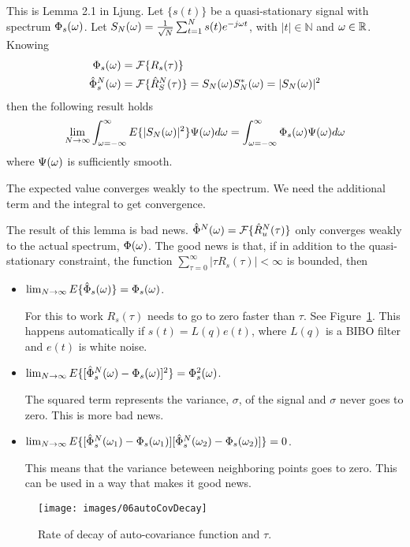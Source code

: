 \begin{lemma}
This is Lemma 2.1 in Ljung.
Let $\{s(t)\}$ be a quasi-stationary signal with spectrum $\Phi_s(\omega)$.
Let $S_N(\omega) = \frac{1}{\sqrt{N}} \sum_{t=1}^N s(t)e^{-j\omega t}$, with $|t|\in\mathbb{N}$ and $\omega\in\mathbb{R}$.
Knowing
\begin{align*}
\Phi_s(\omega) &= \mathcal{F}\{R_s(\tau)\} \\
\hat{\Phi}_s^N(\omega) &= \mathcal{F}\{\hat{R}_S^N(\tau)\} = S_N(\omega)S_N^*(\omega) = |S_N(\omega)|^2
\end{align*}
then the following result holds
$$\lim_{N\to\infty} \int_{\omega=-\infty}^\infty E\{|S_N(\omega)|^2\}\Psi(\omega)d\omega = \int_{\omega=-\infty}^\infty \Phi_s(\omega)\Psi(\omega)d\omega$$
where $\Psi(\omega)$ is sufficiently smooth.
\end{lemma}
The expected value converges weakly to the spectrum.
We need the additional term and the integral to get convergence.

The result of this lemma is bad news.
$\hat{\Phi}^N(\omega) = \mathcal{F}\{\hat{R}_u^N(\tau)\}$ only converges weakly to the actual spectrum, $\Phi(\omega)$.
The good news is that, if in addition to the quasi-stationary constraint, the function $\sum_{\tau=0}^\infty|\tau R_s(\tau)|<\infty$ is bounded, then
\begin{itemize}
\item $\lim_{N\to\infty}E\{\hat{\Phi}_s(\omega)\} = \Phi_s(\omega)$.

      For this to work $R_s(\tau)$ needs to go to zero faster than $\tau$.
      See Figure~\ref{fig:06autoCovDecay}.
      This happens automatically if $s(t)=L(q)e(t)$, where $L(q)$ is a BIBO filter and $e(t)$ is white noise.
\item $\lim_{N\to\infty}E\{[\hat{\Phi}_s^N(\omega)-\Phi_s(\omega)]^2\} = \Phi_s^2(\omega)$.%

      The squared term represents the variance, $\sigma$, of the signal and $\sigma$ never goes to zero.
      This is more bad news.
\item $\lim_{N\to\infty}E\{[\hat{\Phi}_s^N(\omega_1)-\Phi_s(\omega_1)][\hat{\Phi}_s^N(\omega_2)-\Phi_s(\omega_2)]\} = 0$.

      This means that the variance beteween neighboring points goes to zero.
      This can be used in a way that makes it good news.
\end{itemize}

\begin{figure}[ht!]
\centering
\texttt{[image: images/06autoCovDecay]}
\caption{Rate of decay of auto-covariance function and $\tau$.}
\label{fig:06autoCovDecay}
\end{figure}

